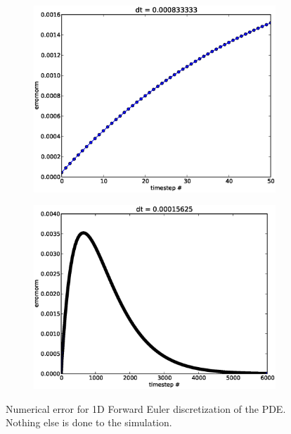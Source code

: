 \begin{figure}[H]
\centering
\begin{subfigure}[b]{0.48\textwidth}
\includegraphics[width=\textwidth]{../doc/results/experiment_31102013_1017/results/deterministic_errorplot.eps}
\caption{}%
\label{errorplot_FE1D_noWalk}
\end{subfigure}
\begin{subfigure}[b]{0.48\textwidth}
 \includegraphics[width=\textwidth]{../doc/results/experiment_18112013_0830/results/deterministic_errorplot.eps}
 \caption{}
 \label{errorplot_FE1D_noWalk_long}
\end{subfigure}
\caption[Numerical error for 1D Forward Euler discretization]{Numerical error for 1D Forward Euler discretization of the PDE. Nothing else is done to the simulation.}
\label{errorplot_FE1D_noWalk_super}
\end{figure}


